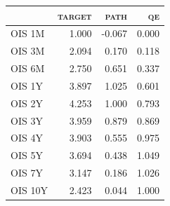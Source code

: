 \begin{tabular}{lrrr}
\toprule
 & \textsc{target} & \textsc{path} & \textsc{qe} \\
\midrule
OIS 1M & 1.000 & -0.067 & 0.000 \\
OIS 3M & 2.094 & 0.170 & 0.118 \\
OIS 6M & 2.750 & 0.651 & 0.337 \\
OIS 1Y & 3.897 & 1.025 & 0.601 \\
OIS 2Y & 4.253 & 1.000 & 0.793 \\
OIS 3Y & 3.959 & 0.879 & 0.869 \\
OIS 4Y & 3.903 & 0.555 & 0.975 \\
OIS 5Y & 3.694 & 0.438 & 1.049 \\
OIS 7Y & 3.147 & 0.186 & 1.026 \\
OIS 10Y & 2.423 & 0.044 & 1.000 \\
\bottomrule
\end{tabular}
